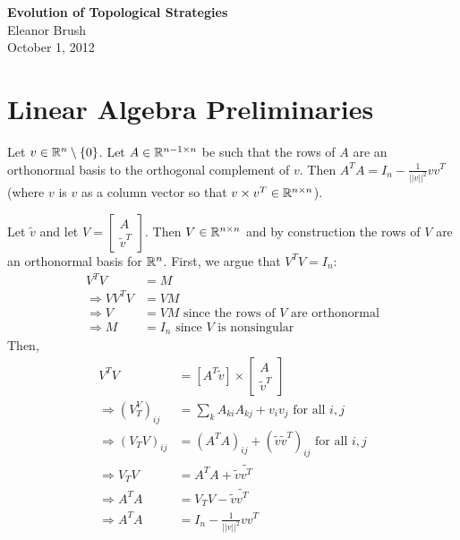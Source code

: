 \documentclass{article}
\begin{document}
\begin{center}
{\bf \LARGE{Evolution of Topological Strategies}}
\vspace{10pt}
\\ Eleanor Brush
\\ October 1, 2012
\end{center}

\tableofcontents

\section{Linear Algebra Preliminaries}

\begin{claim}
Let $v\in{\mathbb{R}}^n\setminus\{0\}$.  Let $A\in{\mathbb{R}}^{n-1\times n}$ be such that the rows of $A$ are an orthonormal basis to the orthogonal complement of $v$.  Then $A^TA=I_n-\frac{1}{||v||^2}vv^T$ (where $v$ is $v$ as a column vector so that $v\times v^T\in{\mathbb{R}}^{n\times n}$).
\end{claim}

\begin{pf}
Let $\tilde{v}$ and let $V=\left[\begin{array}{cc}A \\ \tilde{v}^T\end{array}\right].$  Then $V\in{\mathbb{R}}^{n\times n}$ and by construction the rows of $V$ are an orthonormal basis for ${\mathbb{R}}^n$.  First, we argue that $V^TV=I_n:$
\begin{align*}
V^TV&=M
\\ \Rightarrow VV^TV&=VM
\\ \Rightarrow V&=VM \text{ since the rows of $V$ are orthonormal} 
\\ \Rightarrow M&=I_n \text{ since $V$ is nonsingular}
\end{align*}
Then,
\begin{align*}
V^TV&=\left[A^T \tilde{v}\right]\times\left[ \begin{array}{cc}A\\ \tilde{v}^T\end{array}\right]
\\\Rightarrow (V_T^V)_{ij}&=\sum_kA_{ki}A_{kj}+v_iv_j \text{ for all $i,j$}
\\ \Rightarrow (V_TV)_{ij}&=(A^TA)_{ij}+(\tilde{v}\tilde{v}^T)_{ij} \text{ for all $i,j$}
\\ \Rightarrow V_TV&=A^TA+\tilde{v}\tilde{v^T}
\\ \Rightarrow A^TA&=V_TV-\tilde{v}\tilde{v^T}
\\ \Rightarrow A^TA&=I_n-\frac{1}{||v||^2}vv^T
\end{align*}
\end{pf}
\end{document}

